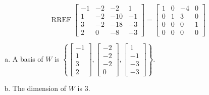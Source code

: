 \begin{exerciseAnswer} 


\[\operatorname{RREF} \left[\begin{array}{cccc}
-1 & -2 & -2 & 1 \\
1 & -2 & -10 & -1 \\
3 & -2 & -18 & -3 \\
2 & 0 & -8 & -3
\end{array}\right] = \left[\begin{array}{cccc}
1 & 0 & -4 & 0 \\
0 & 1 & 3 & 0 \\
0 & 0 & 0 & 1 \\
0 & 0 & 0 & 0
\end{array}\right] \]


\begin{enumerate}[(a)]
\item A basis of \(W\) is \( \left\{ \left[\begin{array}{c}
-1 \\
1 \\
3 \\
2
\end{array}\right] , \left[\begin{array}{c}
-2 \\
-2 \\
-2 \\
0
\end{array}\right] , \left[\begin{array}{c}
1 \\
-1 \\
-3 \\
-3
\end{array}\right] \right\} \).
\item The dimension of \(W\) is \( 3 \).
\end{enumerate}
    
\end{exerciseAnswer}
    
